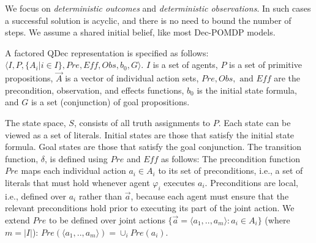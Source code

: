 \documentclass[letterpaper]{article} %
\theoremstyle{definition}
\begin{document}
We focus on {\em deterministic outcomes} and {\em deterministic observations}. In such cases a successful solution is acyclic, and there is no need to bound the number of steps.
We assume a shared initial belief, like most Dec-POMDP models.

A factored QDec representation is specified as follows: $\langle I,P,\{A_i | i\in I\},\mathit{Pre},\mathit{Eff},\mathit{Obs},b_0,G\rangle$. $I$ is a set of agents, $P$ is a set of primitive propositions, $\vec{A}$ is a vector of individual action sets,  $\mathit{Pre, Obs,} \text{ and } \mathit{Eff}$ are the precondition, observation, and effects functions,
$b_0$ is the initial state formula, and $G$ is a set (conjunction) of goal propositions.


The state space, $S$, consists of all truth assignments to $P$. Each state can be viewed as a set of literals. Initial states are those that satisfy the initial state formula. Goal states are those that satisfy the goal conjunction.
%
The transition function,
$\delta$, is defined using  $\mathit{Pre}$ and  $\mathit{Eff}$ as follows:
The precondition function $\mathit{Pre}$ maps each individual action $a_i\in A_i$ to its set of preconditions, i.e., a set of literals that must
hold whenever agent $\varphi_i$ executes $a_i$. Preconditions are local, i.e., defined over $a_i$ rather than $\vec{a}$, because each agent must ensure that the relevant preconditions hold prior to executing its part of the joint action. We extend $\mathit{Pre}$ to be defined over joint actions $\{\vec{a}=\langle a_1,..,a_m\rangle : a_i \in A_i\}$ (where $m=|I|$):
$\mathit{Pre}(\langle a_1,..,a_m\rangle) = \cup_i \mathit{Pre}(a_i)$.
\end{document}
